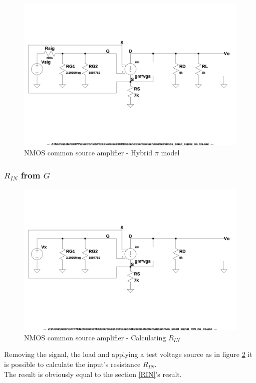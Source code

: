 \documentclass[10pt,a4paper]{book}
\begin{document}
\begin{figure}[h]
  \centering
  \includegraphics[width=12cm]{schematics/nmos_small_signal_no_Cs.jpg}
  \caption{NMOS common source amplifier - Hybrid $\pi$ model}
  \label{nmos_pi_no_Cs}
\end{figure}

\subsubsection{$R_{IN}$ from $G$}

\begin{figure}[h]
  \centering
  \includegraphics[width=12cm]{schematics/nmos_small_signal_RIN_no_Cs.jpg}
  \caption{NMOS common source amplifier - Calculating $R_{IN}$}
  \label{nmos_pi_RIN_no_Cs}
\end{figure}

Removing the signal, the load and applying a test voltage source as in figure \ref{nmos_pi_RIN_no_Cs} it is possible to calculate the input's resistance $R_{IN}$.\\
The result is obviously equal to the section \ref{RIN}'s result.\par
\end{document}

